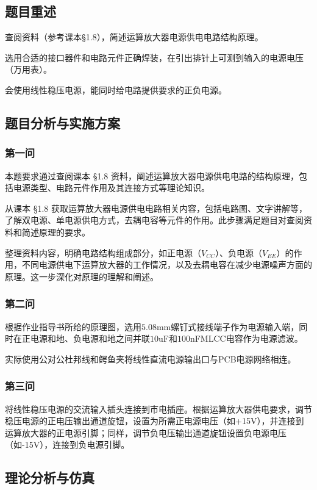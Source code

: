 \documentclass[./测控三级项目.tex]{subfiles} %
\begin{document}
	\subsection{题目重述}
	\begin{compactenum}
		\item 查阅资料（参考课本§1.8），简述运算放大器电源供电电路结构原理。
		\item 选用合适的接口器件和电路元件正确焊装，在引出排针上可测到输入的电源电压（万用表）。
		\item 会使用线性稳压电源，能同时给电路提供要求的正负电源。\label{aa}
	\end{compactenum}
	\subsection{题目分析与实施方案}
	\subsubsection{第一问}
	本题要求通过查阅课本 §1.8 资料，阐述运算放大器电源供电电路的结构原理，包括电源类型、电路元件作用及其连接方式等理论知识。\par
	从课本 §1.8 获取运算放大器电源供电电路相关内容，包括电路图、文字讲解等，了解双电源、单电源供电方式，去耦电容等元件的作用。此步骤满足题目对查阅资料和简述原理的要求。\par
	整理资料内容，明确电路结构组成部分，如正电源（$V_{CC}$）、负电源（$V_{EE}$）的作用，不同电源供电下运算放大器的工作情况，以及去耦电容在减少电源噪声方面的原理。这一步深化对原理的理解和阐述。
	\subsubsection{第二问}
	根据作业指导书所给的原理图，选用$5.08$mm螺钉式接线端子作为电源输入端，同时在正电源和地、负电源和地之间并联$10$uF和$100$nFMLCC电容作为电源滤波。\par
	实际使用公对公杜邦线和鳄鱼夹将线性直流电源输出口与PCB电源网络相连。
	\subsubsection{第三问}
	将线性稳压电源的交流输入插头连接到市电插座。根据运算放大器供电要求，调节稳压电源的正电压输出通道旋钮，设置为所需正电源电压（如+15V），并连接到运算放大器的正电源引脚；同样，调节负电压输出通道旋钮设置负电源电压（如-15V），连接到负电源引脚。
	\subsection{理论分析与仿真}
\end{document}
